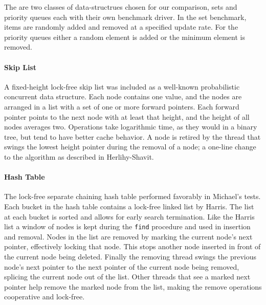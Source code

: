 
The are two classes of data-structrues chosen for our comparison, sets and priority queues each with their own benchmark driver. In the set benchmark, items are randomly added and removed at a specified update rate. For the priority queues either a random element is added or the minimum element is removed.

\paragraph{Skip List} A fixed-height lock-free skip list was included as a well-known probabilistic concurrent data structure.  Each node contains one value, and the nodes are arranged in a list with a set of one or more forward pointers.  Each forward pointer points to the next node with at least that height, and the height of all nodes averages two.  Operations take logarithmic time, as they would in a binary tree, but tend to have better cache behavior. A node is retired by the thread that swings the lowest height pointer during the removal of a node; a one-line change to the algorithm as described in Herlihy-Shavit.\cite{HSBook}

\paragraph{Hash Table} The lock-free separate chaining hash table performed favorably in Michael's tests.\cite{HashTables} Each bucket in the hash table contains a lock-free linked list by Harris.\cite{Harris} The list at each bucket is sorted and allows for early search termination. Like the Harris list a window of nodes is kept during the \texttt{find} procedure and used in insertion and removal. Nodes in the list are removed by marking the current node's next pointer, effectively locking that node. This stops another node inserted in front of the current node being deleted. Finally the removing thread swings the previous node's next pointer to the next pointer of the current node being removed, splicing the current node out of the list. Other threads that see a marked next pointer help remove the marked node from the list, making the remove operations cooperative and lock-free.

